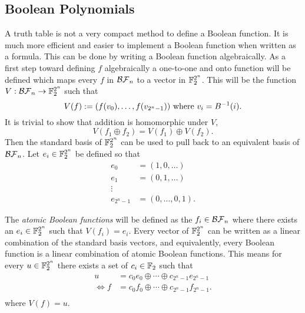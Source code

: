 \subsection{Boolean Polynomials}
\par A truth table is not a very compact method to define a Boolean
function. It is much more efficient and easier to implement a Boolean
function when written as a formula. This can be done by writing a Boolean
function algebraically. As a first step toward defining $f$ algebraically a
one-to-one and onto function will be defined which maps every $f$ in
$\mathcal{BF}_n$ to a vector in $\mathbb{F}_2^{2^n}$. This will be the function
$V:\mathcal{BF}_n\rightarrow\mathbb{F}_2^{2^n}$ such that
\begin{equation}\label{eqn:bool-vector}
	V(f)
    :=(f(v_0),\dots,f(v_{2^n-1}))\ {\rm where\ } v_i=B^{-1}(i).
\end{equation}
It is trivial to show that addition is homomorphic under $V$,
\[
V(f_1\oplus f_2)=V(f_1)\oplus V(f_2).
\]
Then the standard basis of $\mathbb{F}_2^{2^n}$ can be used to pull back to an
equivalent basis of $\mathcal{BF}_n$. Let $e_i\in\mathbb{F}_2^{2^n}$ be defined so that
\begin{align*}
	e_0&=(1,0,\dots)\\
	e_1&=(0,1,\dots)\\
	\vdots \\
	e_{2^n-1}&=(0,\dots,0,1).
\end{align*}
\par The {\em atomic Boolean functions} will be defined as the
$f_i\in\mathcal{BF}_n$ where there exists an $e_i\in\mathbb{F}_2^{2^n}$ such that
$V(f_i)=e_i$. Every vector of $\mathbb{F}_2^{2^n}$ can be written as a linear
combination of the standard basis vectors, and equivalently, every Boolean
function is a linear combination of atomic Boolean functions. This means
for every $u\in\mathbb{F}_2^{2^n}$ there exists a set of $c_i\in\mathbb{F}_2$ such that
\begin{align*}
	u  &=c_0e_0\oplus\cdots\oplus c_{2^n-1}e_{2^n-1} \\
	\Leftrightarrow f &=c_0f_0\oplus\cdots\oplus c_{2^n-1}f_{2^n-1}.\\
\end{align*}
where $V(f)=u$.

